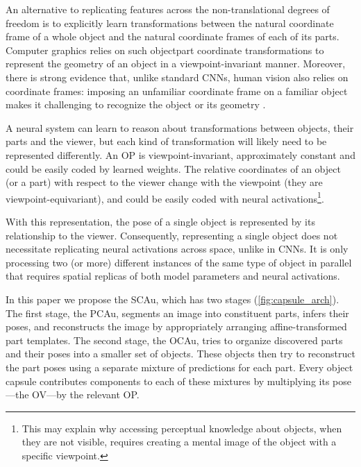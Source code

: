 \documentclass{article}
\begin{document}
An alternative to replicating features across the non-translational degrees of freedom is to explicitly learn transformations between the natural coordinate frame of a whole object and the natural coordinate frames of each of its parts.   Computer graphics relies on such objectpart coordinate transformations to represent the geometry of an object in a viewpoint-invariant manner. Moreover, there is strong evidence that, unlike standard \gls{CNN}s, human vision also relies on coordinate frames: imposing an unfamiliar coordinate frame on a familiar object makes it challenging to recognize the object or its geometry \citep{Rock73, Hinton79}.

A neural system can learn to reason about transformations between objects, their parts and the viewer, but each kind of transformation will likely need to be represented differently.
An \gls{OP} is viewpoint-invariant, approximately constant and could be easily coded by learned weights.  
The relative coordinates of an object (or a part) with respect to the viewer change with the viewpoint (they are viewpoint-equivariant), and could be easily coded with neural activations\footnote{
	This may explain why accessing perceptual knowledge about objects, when they are not visible, requires creating a mental image of the object with a specific viewpoint.
}.

With this representation, the pose of a single object is represented by its relationship to the viewer.
Consequently, representing a single object does not necessitate replicating neural activations across space, unlike in \glspl{CNN}.
It is only processing two (or more) different instances of the same type of object in parallel that requires spatial replicas of both model parameters and neural activations.

In this paper we propose the \gls{SCAu}, which has two stages (\cref{fig:capsule_arch}).
The first stage, the \gls{PCAu}, segments an image into constituent parts, infers their poses, and reconstructs the image by appropriately arranging affine-transformed part templates.
The second stage, the \gls{OCAu}, tries to organize discovered parts and their poses into a smaller set of objects.
These objects then try to reconstruct the part poses using a separate mixture of predictions for each part. 
Every object capsule contributes components to each of these mixtures by multiplying its pose---the \gls{OV}---by the relevant \gls{OP}.
\end{document}
